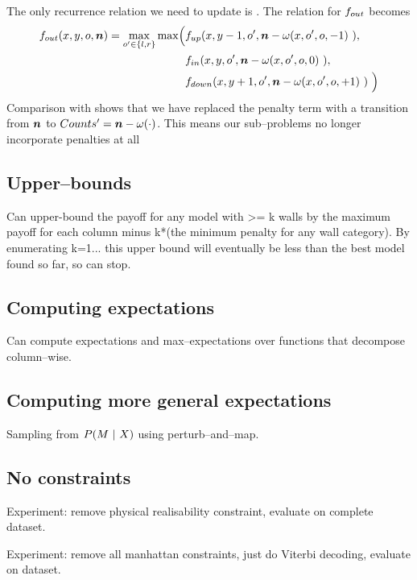 The only recurrence relation we need to update is
. The relation for $\SubProbOUT$ becomes
\begin{equation}
  \begin{split}
    \label{eq:fout-recurrence-aug}
    \SubProbOUT(x,y,\WallOrient,\Counts) = 
    \max_{\WallOrient'\in\{l,r\}} \max \Bigl(
      &\SubProbUP(x,y-1,\WallOrient', 
        \Counts-\CategoryFunc(x,\WallOrient',\WallOrient,-1)~),\\
      &\SubProbIN(x,y,\WallOrient',
        \Counts-\CategoryFunc(x,\WallOrient',\WallOrient,0)~),\\
      &\SubProbDOWN(x,y+1,\WallOrient',
        \Counts-\CategoryFunc(x,\WallOrient',\WallOrient,+1)~)~
    \Bigr)
  \end{split}
\end{equation}
Comparison with  shows that we have replaced
the penalty term with a transition from $\Counts$ to
$Counts'=\Counts-\CategoryFunc(\cdot)$. This means our sub--problems
no longer incorporate penalties at all

\subsection{Upper--bounds}

Can upper-bound the payoff for any model with >= k walls by the
maximum payoff for each column minus k*(the minimum penalty for any
wall category). By enumerating k=1... this upper bound will eventually
be less than the best model found so far, so can stop.

\subsection{Computing expectations}

Can compute expectations and max--expectations over functions that
decompose column--wise.

\subsection{Computing more general expectations}

Sampling from $P(\Scene ~|~ X)$ using perturb--and--map.

\subsection{No constraints}

Experiment: remove physical realisability constraint, evaluate on
complete dataset.

Experiment: remove all manhattan constraints, just do Viterbi
decoding, evaluate on dataset.
